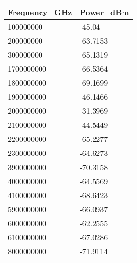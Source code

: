 \begin{tabular}{ll}
Frequency_GHz & Power_dBm \\ 
\hline 
100000000 & -45.04 \\ 
200000000 & -63.7153 \\ 
300000000 & -65.1319 \\ 
1700000000 & -66.5364 \\ 
1800000000 & -69.1699 \\ 
1900000000 & -46.1466 \\ 
2000000000 & -31.3969 \\ 
2100000000 & -44.5449 \\ 
2200000000 & -65.2277 \\ 
2300000000 & -64.6273 \\ 
3900000000 & -70.3158 \\ 
4000000000 & -64.5569 \\ 
4100000000 & -68.6423 \\ 
5900000000 & -66.0937 \\ 
6000000000 & -62.2555 \\ 
6100000000 & -67.0286 \\ 
8000000000 & -71.9114 \\ 
\hline 
\end{tabular}